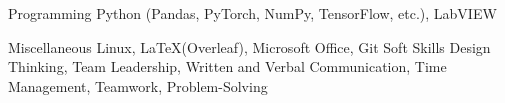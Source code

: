 

\begin{cvskills}

  \cvskill
    {Programming} %
    {Python (Pandas, PyTorch, NumPy, TensorFlow, etc.), LabVIEW} %

  \cvskill
    {Miscellaneous} %
    {Linux, \LaTeX (Overleaf), Microsoft Office, Git} %
  \cvskill
    {Soft Skills} %
    {Design Thinking, Team Leadership, Written and Verbal Communication, Time Management, Teamwork, Problem-Solving} %

\end{cvskills}
